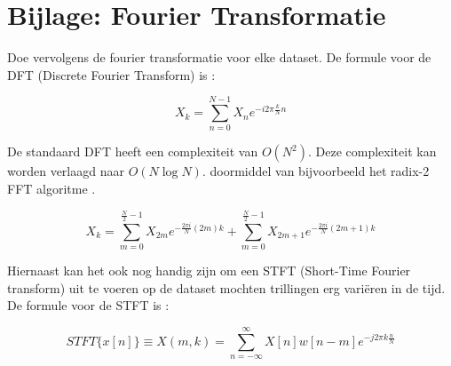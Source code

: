 \appendix

\section{Bijlage: Fourier Transformatie} \label{sec:FourierTransform}

Doe vervolgens de fourier transformatie voor elke dataset. De formule voor de \gls{DFT} (Discrete Fourier Transform) is \cite{web:FFT}: 

\begin{equation}
	X_k=\sum_{n=0}^{N-1}X_ne^{-i2\pi \frac{k}{N}n}
\end{equation}

De standaard DFT heeft een complexiteit van $O\left(N^2\right)$. Deze complexiteit kan worden verlaagd naar $O\left(N\log{N}\right)$. doormiddel van bijvoorbeeld het radix-2 \gls{FFT} algoritme \cite{web:Radix-2FFT}.

\begin{equation}
	X_k= {\sum_{m=0}^{\frac{N}{2}-1}X_{2m}e^{-\frac{2\pi i}{N}(2m)k}} + {\sum_{m=0}^{\frac{N}{2}-1} X_{2m+1}e^{-\frac{2\pi i}{N}(2m + 1)k}}
\end{equation}

Hiernaast kan het ook nog handig zijn om een \gls{STFT} (Short-Time Fourier transform) uit te voeren op de dataset mochten trillingen erg variëren in de tijd.
De formule voor de \gls{STFT} is \cite{web:STFT}:

\begin{equation}
	STFT\{x[n]\} \equiv X(m,k) = \sum_{n=-\infty}^{\infty}X[n]w[n-m]e^{-j 2\pi k\frac{n}{N}}
\end{equation}